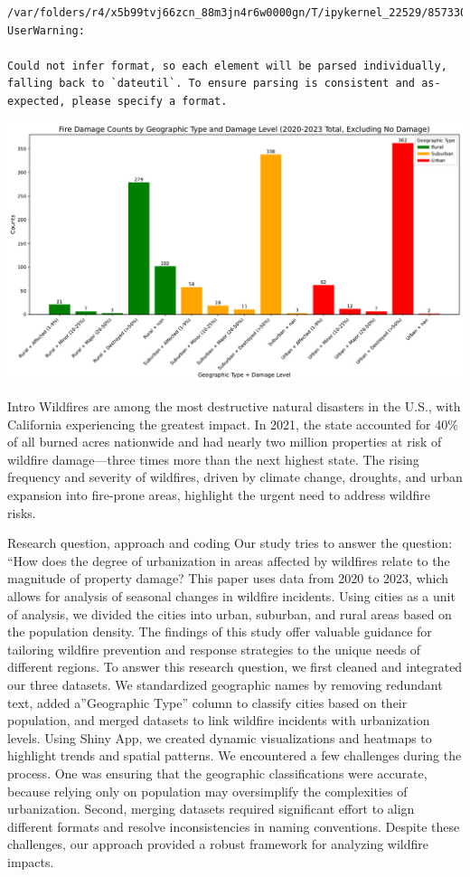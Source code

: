 \documentclass[
  letterpaper,
  DIV=11,
  numbers=noendperiod]{scrartcl}
\begin{document}
\begin{verbatim}
/var/folders/r4/x5b99tvj66zcn_88m3jn4r6w0000gn/T/ipykernel_22529/857330891.py:1: UserWarning:

Could not infer format, so each element will be parsed individually, falling back to `dateutil`. To ensure parsing is consistent and as-expected, please specify a format.
\end{verbatim}

\includegraphics{Final Writeup_files/figure-pdf/cell-19-output-1.pdf}

Intro Wildfires are among the most destructive natural disasters in the
U.S., with California experiencing the greatest impact. In 2021, the
state accounted for 40\% of all burned acres nationwide and had nearly
two million properties at risk of wildfire damage---three times more
than the next highest state. The rising frequency and severity of
wildfires, driven by climate change, droughts, and urban expansion into
fire-prone areas, highlight the urgent need to address wildfire risks.

Research question, approach and coding Our study tries to answer the
question: ``How does the degree of urbanization in areas affected by
wildfires relate to the magnitude of property damage? This paper uses
data from 2020 to 2023, which allows for analysis of seasonal changes in
wildfire incidents. Using cities as a unit of analysis, we divided the
cities into urban, suburban, and rural areas based on the population
density. The findings of this study offer valuable guidance for
tailoring wildfire prevention and response strategies to the unique
needs of different regions. To answer this research question, we first
cleaned and integrated our three datasets. We standardized geographic
names by removing redundant text, added a''Geographic Type'' column to
classify cities based on their population, and merged datasets to link
wildfire incidents with urbanization levels. Using Shiny App, we created
dynamic visualizations and heatmaps to highlight trends and spatial
patterns. We encountered a few challenges during the process. One was
ensuring that the geographic classifications were accurate, because
relying only on population may oversimplify the complexities of
urbanization. Second, merging datasets required significant effort to
align different formats and resolve inconsistencies in naming
conventions. Despite these challenges, our approach provided a robust
framework for analyzing wildfire impacts.
\end{document}
